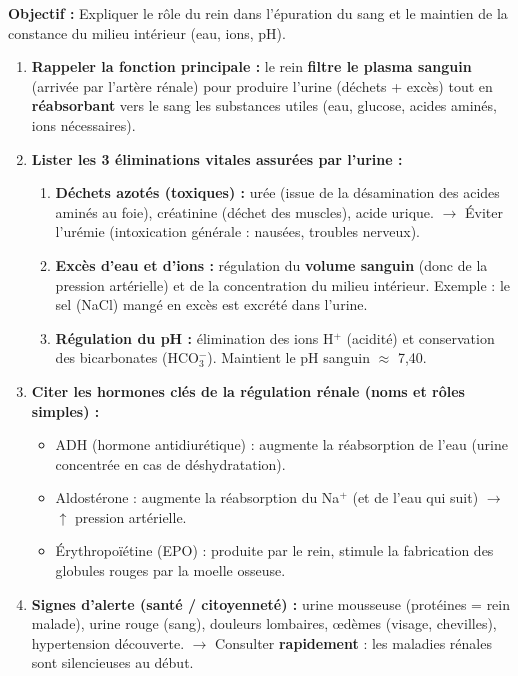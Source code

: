 \documentclass[11pt]{article}
\newcommand{\cle}[1]{{\popxbold\color{popdark}#1}}
\begin{document}
\begin{methode}
    \textbf{Objectif :} Expliquer le rôle du rein dans l'épuration du sang et le maintien de la constance du milieu intérieur (eau, ions, pH).
    \begin{enumerate}
        \item \textbf{Rappeler la fonction principale :} le rein \textbf{filtre le plasma sanguin} (arrivée par l'artère rénale) pour produire l'\cle{urine} (déchets + excès) tout en \textbf{réabsorbant} vers le sang les substances utiles (eau, glucose, acides aminés, ions nécessaires).
        \item \textbf{Lister les 3 éliminations vitales assurées par l'urine :}
            \begin{enumerate}
                \item \textbf{Déchets azotés (toxiques) :} \cle{urée} (issue de la désamination des acides aminés au foie), \cle{créatinine} (déchet des muscles), acide urique. $\rightarrow$ Éviter l'\cle{urémie} (intoxication générale : nausées, troubles nerveux).
                \item \textbf{Excès d'eau et d'ions :} régulation du \textbf{volume sanguin} (donc de la \cle{pression artérielle}) et de la concentration du milieu intérieur. Exemple : le sel (NaCl) mangé en excès est excrété dans l'urine.
                \item \textbf{Régulation du pH :} élimination des ions \cle{H$^+$} (acidité) et conservation des bicarbonates (\cle{HCO$_3^-$}). Maintient le pH sanguin $\approx$ 7,40.
            \end{enumerate}
        \item \textbf{Citer les hormones clés de la régulation rénale (noms et rôles simples) :}
            \begin{itemize}
                \item \cle{ADH (hormone antidiurétique)} : augmente la réabsorption de l'eau (urine concentrée en cas de déshydratation).
                \item \cle{Aldostérone} : augmente la réabsorption du Na$^+$ (et de l'eau qui suit) $\rightarrow$ $\uparrow$ pression artérielle.
                \item \cle{Érythropoïétine (EPO)} : produite par le rein, stimule la fabrication des globules rouges par la moelle osseuse.
            \end{itemize}
        \item \textbf{Signes d'alerte (santé / citoyenneté) :} urine mousseuse (protéines = rein malade), urine rouge (sang), douleurs lombaires, œdèmes (visage, chevilles), hypertension découverte. $\rightarrow$ Consulter \textbf{rapidement} : les maladies rénales sont silencieuses au début.
    \end{enumerate}
\end{methode}
\end{document}
